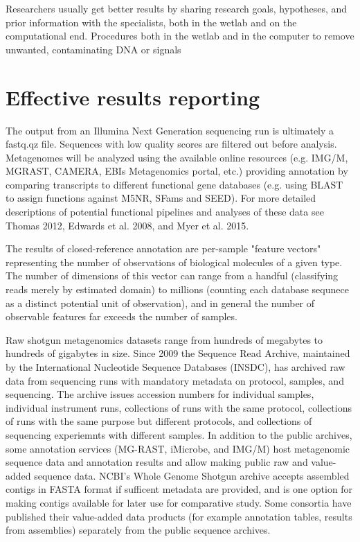 \documentclass[graybox]{svmult}
\begin{document}
Researchers usually get better results by sharing research goals, hypotheses, and prior information with the specialists, both in the wetlab and on the computational end.  Procedures both in the wetlab and in the computer to remove unwanted, contaminating DNA or signals 


\section{Effective results reporting }
\label{sec:5}

The output from an Illumina Next Generation sequencing run is ultimately a fastq.qz file. Sequences with low quality scores are filtered out before analysis. Metagenomes will be analyzed using the available online resources (e.g. IMG/M, MGRAST, CAMERA, EBIs Metagenomics portal, etc.) providing annotation by comparing transcripts to different functional gene databases (e.g. using BLAST to assign functions against M5NR, SFams and SEED). For more detailed descriptions of potential functional pipelines and analyses of these data see Thomas 2012, Edwards et al. 2008, and Myer et al. 2015.

        The results of closed-reference annotation are per-sample "feature vectors" representing the number of observations of biological molecules of a given type.  The number of dimensions of this vector can range from a handful (classifying reads merely by estimated domain) to millions (counting each database sequnece as a distinct potential unit of observation), and in general the number of observable features far exceeds the number of samples.

        Raw shotgun metagenomics datasets range from hundreds of megabytes to hundreds of gigabytes in size.  Since 2009 the Sequence Read Archive, maintained by the International Nucleotide Sequence Databases (INSDC), has archived raw data from sequencing runs with mandatory metadata on protocol, samples, and sequencing.  The archive issues accession numbers for individual samples, individual instrument runs, collections of runs with the same protocol, collections of runs with the same purpose but different protocols, and collections of sequencing experiemnts with different samples.
In addition to the public archives, some annotation services (MG-RAST, iMicrobe, and IMG/M) host metagenomic sequence data and annotation results and allow making public raw and value-added sequence data.    NCBI's Whole Genome Shotgun archive accepts assembled contigs in FASTA format if sufficent metadata are provided, and is one option for making contigs available for later use for comparative study.
Some consortia have published their value-added data products (for example annotation tables, results from assemblies) separately from the public sequence archives.
\end{document}
